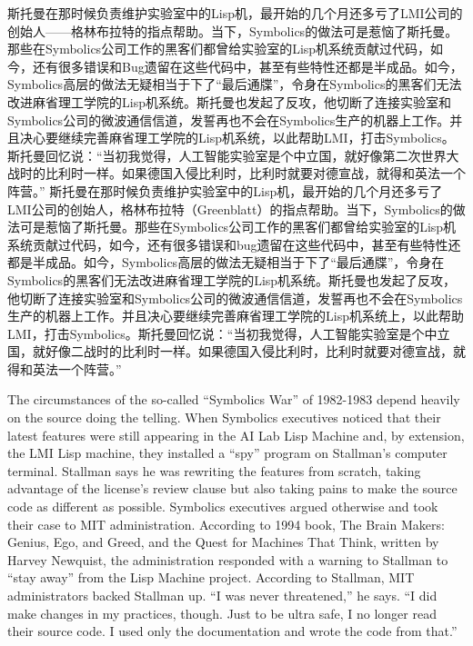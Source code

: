 \ifdefined\chs
\ifdefined\vone
斯托曼在那时候负责维护实验室中的Lisp机，最开始的几个月还多亏了LMI公司的创始人——格林布拉特的指点帮助。当下，Symbolics的做法可是惹恼了斯托曼。那些在Symbolics公司工作的黑客们都曾给实验室的Lisp机系统贡献过代码，如今，还有很多错误和Bug遗留在这些代码中，甚至有些特性还都是半成品。如今，Symbolics高层的做法无疑相当于下了``最后通牒''，令身在Symbolics的黑客们无法改进麻省理工学院的Lisp机系统。斯托曼也发起了反攻，他切断了连接实验室和Symbolics公司的微波通信信道，发誓再也不会在Symbolics生产的机器上工作。并且决心要继续完善麻省理工学院的Lisp机系统，以此帮助LMI，打击Symbolics。斯托曼回忆说：``当初我觉得，人工智能实验室是个中立国，就好像第二次世界大战时的比利时一样。如果德国入侵比利时，比利时就要对德宣战，就得和英法一个阵营。''
\fi
\ifdefined\vtwo
斯托曼在那时候负责维护实验室中的Lisp机，最开始的几个月还多亏了LMI公司的创始人，格林布拉特（Greenblatt）的指点帮助。当下，Symbolics的做法可是惹恼了斯托曼。那些在Symbolics公司工作的黑客们都曾给实验室的Lisp机系统贡献过代码，如今，还有很多错误和bug遗留在这些代码中，甚至有些特性还都是半成品。如今，Symbolics高层的做法无疑相当于下了``最后通牒''，令身在Symbolics的黑客们无法改进麻省理工学院的Lisp机系统。斯托曼也发起了反攻，他切断了连接实验室和Symbolics公司的微波通信信道，发誓再也不会在Symbolics生产的机器上工作。并且决心要继续完善麻省理工学院的Lisp机系统上，以此帮助LMI，打击Symbolics。斯托曼回忆说：``当初我觉得，人工智能实验室是个中立国，就好像二战时的比利时一样。如果德国入侵比利时，比利时就要对德宣战，就得和英法一个阵营。''
\fi
\fi

\ifdefined\vone
\ifdefined\eng
The circumstances of the so-called ``Symbolics War'' of 1982-1983 depend heavily on the source doing the telling. When Symbolics executives noticed that their latest features were still appearing in the AI Lab Lisp Machine and, by extension, the LMI Lisp machine, they installed a ``spy'' program on Stallman's computer terminal. Stallman says he was rewriting the features from scratch, taking advantage of the license's review clause but also taking pains to make the source code as different as possible. Symbolics executives argued otherwise and took their case to MIT administration. According to 1994 book, The Brain Makers: Genius, Ego, and Greed, and the Quest for Machines That Think, written by Harvey Newquist, the administration responded with a warning to Stallman to ``stay away'' from the Lisp Machine project. According to Stallman, MIT administrators backed Stallman up. ``I was never threatened,'' he says. ``I did make changes in my practices, though. Just to be ultra safe, I no longer read their source code. I used only the documentation and wrote the code from that.''
\fi

